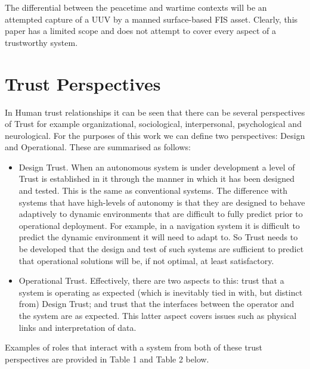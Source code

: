 
The differential between the peacetime and wartime contexts will be an attempted capture of a UUV by a manned surface-based FIS asset.
Clearly, this paper has a limited scope and does not attempt to cover every aspect of a trustworthy system.

\section{Trust Perspectives}

In Human trust relationships it can be seen that there can be several perspectives of Trust for example organizational, sociological, interpersonal, psychological and neurological\cite{Lee2004}.
For the purposes of this work we can define two perspectives: Design and Operational.
These are summarised as follows:
\begin{itemize}
  \item Design Trust.
    When an autonomous system is under development a level of Trust is established in it through the manner in which it has been designed and tested.
    This is the same as conventional systems.
    The difference with systems that have high-levels of autonomy is that they are designed to behave adaptively to dynamic environments that are difficult to fully predict prior to operational deployment.
    For example, in a navigation system it is difficult to predict the dynamic environment it will need to adapt to.
    So Trust needs to be developed that the design and test of such systems are sufficient to predict that operational solutions will be, if not optimal, at least satisfactory.
  \item Operational Trust.
    Effectively, there are two aspects to this: trust that a system is operating as expected (which is inevitably tied in with, but distinct from) Design Trust; and trust that the interfaces between the operator and the system are as expected.
    This latter aspect covers issues such as physical links and interpretation of data.
\end{itemize}

Examples of roles that interact with a system from both of these trust perspectives are provided in Table 1 and Table 2 below.

